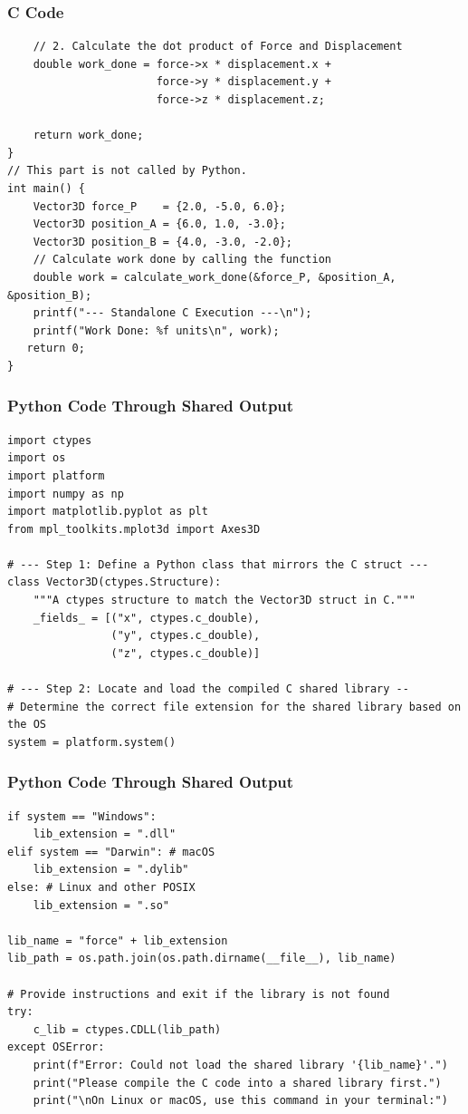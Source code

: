 \documentclass{beamer}
\begin{document}
\begin{frame}[fragile]
\frametitle{C Code}
\begin{lstlisting}
    // 2. Calculate the dot product of Force and Displacement
    double work_done = force->x * displacement.x + 
                       force->y * displacement.y + 
                       force->z * displacement.z;

    return work_done;
}
// This part is not called by Python.
int main() {
    Vector3D force_P    = {2.0, -5.0, 6.0};
    Vector3D position_A = {6.0, 1.0, -3.0};
    Vector3D position_B = {4.0, -3.0, -2.0};
    // Calculate work done by calling the function
    double work = calculate_work_done(&force_P, &position_A, &position_B);
    printf("--- Standalone C Execution ---\n");
    printf("Work Done: %f units\n", work);
   return 0;
}
\end{lstlisting}
\end{frame}
\begin{frame}[fragile]
\frametitle{Python Code Through Shared Output}
\begin{lstlisting}
import ctypes
import os
import platform
import numpy as np
import matplotlib.pyplot as plt
from mpl_toolkits.mplot3d import Axes3D

# --- Step 1: Define a Python class that mirrors the C struct ---
class Vector3D(ctypes.Structure):
    """A ctypes structure to match the Vector3D struct in C."""
    _fields_ = [("x", ctypes.c_double),
                ("y", ctypes.c_double),
                ("z", ctypes.c_double)]

# --- Step 2: Locate and load the compiled C shared library --
# Determine the correct file extension for the shared library based on the OS
system = platform.system()
\end{lstlisting}
\end{frame}
\begin{frame}[fragile]
\frametitle{Python Code Through Shared Output}
\begin{lstlisting}
if system == "Windows":
    lib_extension = ".dll"
elif system == "Darwin": # macOS
    lib_extension = ".dylib"
else: # Linux and other POSIX
    lib_extension = ".so"

lib_name = "force" + lib_extension
lib_path = os.path.join(os.path.dirname(__file__), lib_name)

# Provide instructions and exit if the library is not found
try:
    c_lib = ctypes.CDLL(lib_path)
except OSError:
    print(f"Error: Could not load the shared library '{lib_name}'.")
    print("Please compile the C code into a shared library first.")
    print("\nOn Linux or macOS, use this command in your terminal:")
    \end{lstlisting}
\end{frame}
\end{document}
